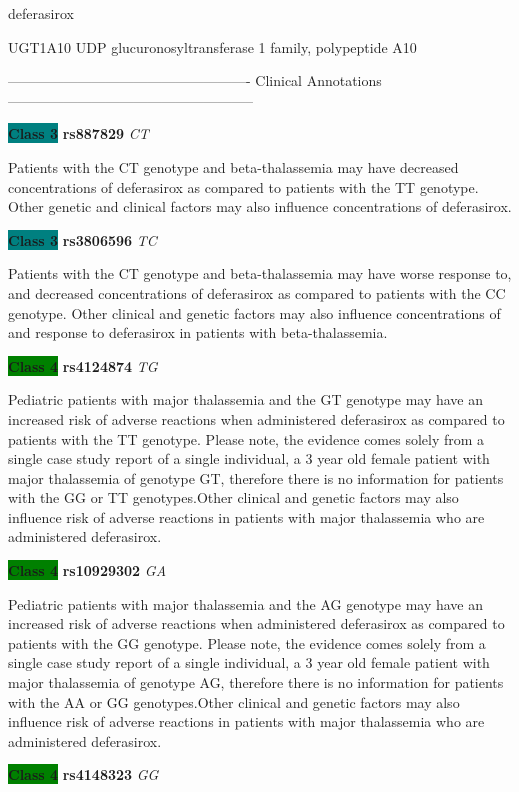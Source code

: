 \documentclass{resume} %
\begin{document}
\begin{rSection}{ deferasirox }
\begin{rSubsection}{ UGT1A10 }{ UDP glucuronosyltransferase 1 family, polypeptide A10 }{}{}
\item[] ---------------------------------------------------- Clinical Annotations -----------------------------------------------------\newline
\item \textbf{\colorbox{teal} {Class 3}} \textbf{ rs887829 } \textit{ CT }
\item[] Patients with the CT genotype and beta-thalassemia may have decreased concentrations of deferasirox as compared to patients with the TT genotype. Other genetic and clinical factors may also influence concentrations of deferasirox.\item \textbf{\colorbox{teal} {Class 3}} \textbf{ rs3806596 } \textit{ TC }
\item[] Patients with the CT genotype and beta-thalassemia may have worse response to, and decreased concentrations of deferasirox as compared to patients with the CC genotype. Other clinical and genetic factors may also influence concentrations of and response to deferasirox in patients with beta-thalassemia.\item \textbf{\colorbox{green} {Class 4}} \textbf{ rs4124874 } \textit{ TG }
\item[] Pediatric patients with major thalassemia and the GT genotype may have an increased risk of adverse reactions when administered deferasirox as compared to patients with the TT genotype. Please note, the evidence comes solely from a single case study report of a single individual, a 3 year old female patient with major thalassemia of genotype GT, therefore there is no information for patients with the GG or TT genotypes.Other clinical and genetic factors may also influence risk of adverse reactions in patients with major thalassemia who are administered deferasirox. \item \textbf{\colorbox{green} {Class 4}} \textbf{ rs10929302 } \textit{ GA }
\item[] Pediatric patients with major thalassemia and the AG genotype may have an increased risk of adverse reactions when administered deferasirox as compared to patients with the GG genotype. Please note, the evidence comes solely from a single case study report of a single individual, a 3 year old female patient with major thalassemia of genotype AG, therefore there is no information for patients with the AA or GG genotypes.Other clinical and genetic factors may also influence risk of adverse reactions in patients with major thalassemia who are administered deferasirox.\item \textbf{\colorbox{green} {Class 4}} \textbf{ rs4148323 } \textit{ GG }

\end{rSubsection}
\end{rSection}
\end{document}
